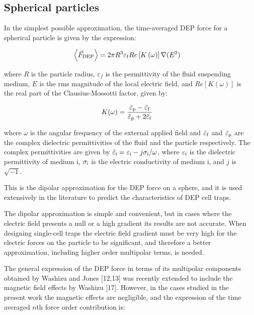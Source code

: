 \documentclass[12pt]{report}
\begin{document}
\subsection*{Spherical particles}
In the simplest possible approximation, the time-averaged DEP force for a spherical particle is given by the expression:

\begin{equation}\left<\vec{F}_{\rm{DEP}}\right>=2\pi R^3\varepsilon_{\rm{f}}Re\left[K\left(\omega\right)\right]\nabla(E^2)\end{equation}

where $R$ is the particle radius, $\varepsilon_f$ is the permittivity of the fluid suspending medium, $E$ is the rms magnitude of the local electric field, and $Re[K(\omega)]$ is the real part of the Clausius-Mossotti factor, given by:

\begin{equation}K(\omega)=\frac{\tilde{\varepsilon}_{\rm{p}}-\tilde{\varepsilon}_{\rm{f}}}{\tilde{\varepsilon}_{\rm{p}}+2\tilde{\varepsilon}_{\rm{f}}}\end{equation}

where $\omega$ is the angular frequency of the external applied field and $\tilde{\varepsilon}_{\rm{f}}$ and $\tilde{\varepsilon}_{\rm{p}}$ are the complex dielectric permittivities of the fluid and the particle respectively. The complex permittivities are given by $\tilde{\varepsilon}_{\rm{i}}=\varepsilon_{\rm{i}}-j\sigma_{\rm{i}}/\omega$, where $\varepsilon_{\rm{i}}$ is the dielectric permittivity of medium i, $\sigma_{\rm{i}}$ is the electric conductivity of medium i, and $j$ is $\sqrt{-1}$. 

This is the dipolar approximation for the DEP force on a sphere, and it is used extensively in the literature to predict the characteristics of DEP cell traps.

The dipolar approximation is simple and convenient, but in cases where the electric field presents a null or a high gradient its results are not accurate. When designing single-cell traps the electric field gradient must be very high for the electric forces on the particle to be significant, and therefore a better approximation, including higher order multipolar terms, is needed.

The general expression of the DEP force in terms of its multipolar components obtained by Washizu and Jones [12,13] was recently extended to include the magnetic field effects by Washizu [17]. However, in the cases studied in the present work the magnetic effects are negligible, and the expression of the time averaged $n$th force order contribution is:
\end{document}
